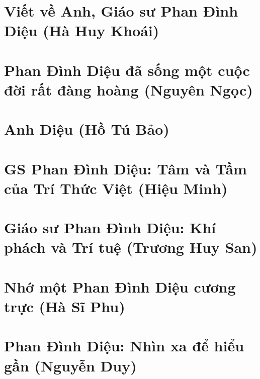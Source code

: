 \documentclass[11pt,twoside]{extreport}
\begin{document}
\newpage


\begin{scriptsize}
\tableofcontents 
\end{scriptsize}




\chapter{Viết về Anh, Giáo sư Phan Đình Diệu (Hà Huy Khoái)}


\chapter{Phan Đình Diệu đã sống một cuộc đời rất đàng hoàng (Nguyên Ngọc)}


\chapter{Anh Diệu (Hồ Tú Bảo)}


\chapter{GS Phan Đình Diệu: Tâm và Tầm của Trí Thức Việt (Hiệu Minh)}


\chapter{Giáo sư Phan Đình Diệu: Khí phách và Trí tuệ (Trương Huy San)}


\chapter{Nhớ một Phan Đình Diệu cương trực (Hà Sĩ Phu)}


\chapter{Phan Đình Diệu: Nhìn xa để hiểu gần (Nguyễn Duy)}

\end{document}
